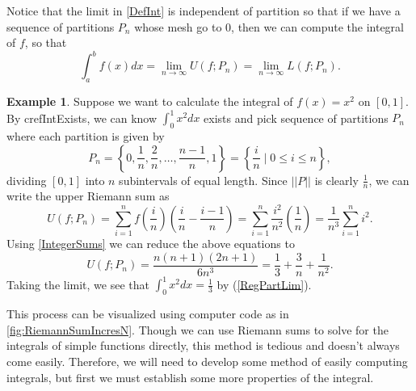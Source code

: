 \documentclass[12pt]{article}
\newcommand{\norm}[1]{ \left|\left| #1 \right|\right| }
\theoremstyle{definition}
\newtheorem{exmp}[thm]{Example}
\theoremstyle{plain}
\numberwithin{equation}{section}
\begin{document}
Notice that the limit in \cref{DefInt} is independent of partition so that if we have a sequence of partitions $P_n$ whose mesh go to 0, then we can compute the integral of $f$, so that
\begin{equation}\label{RegPartLim}
  \int_{a}^{b}f(x)dx=\lim\limits_{n\to\infty}U(f;P_n)=\lim\limits_{n\to\infty}L(f;P_n).
\end{equation}
\begin{exmp}
Suppose we want to calculate the integral of $f(x)=x^2$ on $[0,1]$. By cref{IntExists}, we can know $\int_{0}^{1}x^2dx$ exists and  pick sequence of partitions $P_n$ where each partition is given by
\begin{equation}
  P_n=\left\{0, \frac{1}{n}, \frac{2}{n},\dotsc, \frac{n-1}{n}, 1 \right\}=\left\{\frac{i}{n}\mid 0\leq i\leq n\right\},
\end{equation}
dividing $[0,1]$ into $n$ subintervals of equal length.
Since $\norm{P}$ is clearly $\frac{1}{n}$, we can write the upper Riemann sum as
\begin{equation}
  U(f;P_n)=\sum_{i=1}^{n}f\left(\frac{i}{n}\right)\left(\frac{i}{n}-\frac{i-1}{n}\right)=\sum_{i=1}^{n}\frac{i^2}{n^2}\left(\frac{1}{n}\right)=\frac{1}{n^3}\sum_{i=1}^{n}i^2.
\end{equation}
Using \cref{IntegerSums} we can reduce the above equations to
\begin{equation}
  U(f;P_n)=\frac{n(n+1)(2n+1)}{6n^3}=\frac{1}{3}+\frac{3}{n}+\frac{1}{n^2}.
\end{equation}
Taking the limit, we see that $\int_{0}^{1}x^2dx=\frac{1}{3}$ by (\ref{RegPartLim}).
\end{exmp}

This process can be visualized using computer code as in \cref{fig:RiemannSumIncresN}. Though we can use Riemann sums to solve for the integrals of simple functions directly, this method is tedious and doesn't always come easily. Therefore, we will need to develop some method of easily computing integrals, but first we must establish some more properties of the integral.
\end{document}
